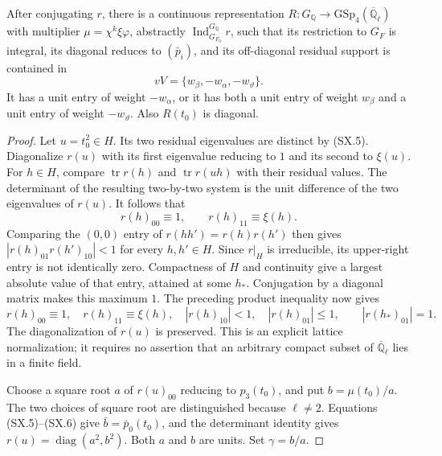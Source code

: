 \begin{proposition}
\label{claim:SX4}
After conjugating $r$, there is a continuous representation
$R:G_{\mathbb Q}\to\mathrm{GSp}_4(\overline{\mathbb Q}_\ell)$
with multiplier $\mu=\chi^k\xi\varphi$, abstractly
$\operatorname{Ind}_{G_{F_0}}^{G_{\mathbb Q}}r$, such that its
restriction to $G_F$ is integral, its diagonal reduces to
$(\bar p_i)$, and its off-diagonal residual support is contained
in
\[
        vV=\{w_\beta,-w_\alpha,-w_\vartheta\}.
                                                            \tag{SX.14}
\]
It has a unit entry of weight $-w_\alpha$, or it has both a unit
entry of weight $w_\beta$ and a unit entry of weight
$-w_\vartheta$.  Also $R(t_0)$ is diagonal.
\end{proposition}
\begin{proof}
Let $u=t_0^2\in H$.  Its two residual eigenvalues are distinct
by (SX.5).  Diagonalize $r(u)$ with its first eigenvalue reducing
to $1$ and its second to $\xi(u)$.  For $h\in H$, compare
$\operatorname{tr}r(h)$ and $\operatorname{tr}r(uh)$ with their
residual values.  The determinant of the resulting two-by-two
system is the unit difference of the two eigenvalues of $r(u)$.
It follows that
\[
       r(h)_{00}\equiv1,\qquad r(h)_{11}\equiv\xi(h).
                                                            \tag{SX.15}
\]
Comparing the $(0,0)$ entry of $r(hh')=r(h)r(h')$ then gives
$|r(h)_{01}r(h')_{10}|<1$ for every $h,h'\in H$.
Since $r|_H$ is irreducible, its upper-right entry is not
identically zero.  Compactness of $H$ and continuity give a
largest absolute value of that entry, attained at some $h_*$.
Conjugation by a diagonal matrix makes this maximum $1$.
The preceding product inequality now gives
\[
 r(h)_{00}\equiv1,\quad r(h)_{11}\equiv\xi(h),\quad
 |r(h)_{10}|<1,\quad |r(h)_{01}|\le1,
 \qquad |r(h_*)_{01}|=1.                            \tag{SX.16}
\]
The diagonalization of $r(u)$ is preserved.  This is an explicit
lattice normalization; it requires no assertion that an arbitrary
compact subset of $\overline{\mathbb Q}_\ell$ lies in a finite field.

Choose a square root $a$ of $r(u)_{00}$ reducing to $p_3(t_0)$,
and put $b=\mu(t_0)/a$.  The two choices of square root are
distinguished because $\ell\ne2$.  Equations (SX.5)--(SX.6)
give $\bar b=\bar p_0(t_0)$, and the determinant identity gives
$r(u)=\operatorname{diag}(a^2,b^2)$.
Both $a$ and $b$ are units.  Set $\gamma=b/a$.


\end{proof}
